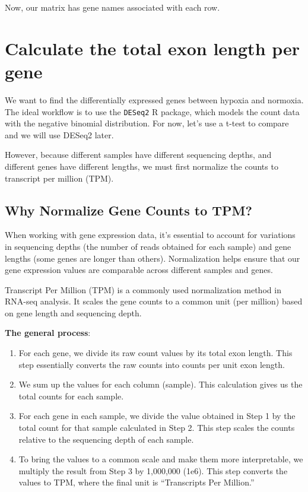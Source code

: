 \documentclass[
]{book}
\begin{document}
Now, our matrix has gene names associated with each row.

\hypertarget{calculate-the-total-exon-length-per-gene}{%
\section{Calculate the total exon length per gene}\label{calculate-the-total-exon-length-per-gene}}

We want to find the differentially expressed genes between hypoxia and normoxia. The ideal workflow is to use the \texttt{DESeq2} R package, which models the count data with the negative binomial distribution. For now, let's use a t-test to compare and we will use DESeq2 later.

However, because different samples have different sequencing depths, and different genes have different lengths, we must first normalize the counts to transcript per million (TPM).

\hypertarget{why-normalize-gene-counts-to-tpm}{%
\subsection{Why Normalize Gene Counts to TPM?}\label{why-normalize-gene-counts-to-tpm}}

When working with gene expression data, it's essential to account for variations in sequencing depths (the number of reads obtained for each sample) and gene lengths (some genes are longer than others). Normalization helps ensure that our gene expression values are comparable across different samples and genes.

Transcript Per Million (TPM) is a commonly used normalization method in RNA-seq analysis. It scales the gene counts to a common unit (per million) based on gene length and sequencing depth.

\textbf{The general process}:

\begin{enumerate}
\def\labelenumi{\arabic{enumi}.}
\item
  For each gene, we divide its raw count values by its total exon length. This step essentially converts the raw counts into counts per unit exon length.
\item
  We sum up the values for each column (sample). This calculation gives us the total counts for each sample.
\item
  For each gene in each sample, we divide the value obtained in Step 1 by the total count for that sample calculated in Step 2. This step scales the counts relative to the sequencing depth of each sample.
\item
  To bring the values to a common scale and make them more interpretable, we multiply the result from Step 3 by 1,000,000 (1e6). This step converts the values to TPM, where the final unit is ``Transcripts Per Million.''
\end{enumerate}
\end{document}

